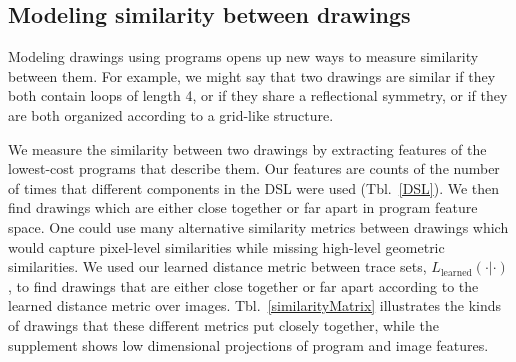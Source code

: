 \documentclass{article}
\newcommand{\probability}{\mathds{P}} %
\theoremstyle{definition}
\begin{document}



\subsection{Modeling similarity between drawings}
Modeling drawings using programs opens up new ways to measure similarity between them.
For example, we might say that two drawings are similar if they both contain loops of length 4,
or if they share a reflectional symmetry,
or if they are both organized according to a grid-like structure.

We measure the similarity between two drawings by extracting features
of the lowest-cost programs that describe them. Our features are counts of the number of times that different components in the
DSL were used (Tbl.~\ref{DSL}).
We  then find drawings which are either close together or far apart in program feature space.
One could use many
alternative similarity metrics between drawings which would capture pixel-level similarities while missing high-level geometric similarities.
We used our learned distance metric between trace sets, $L_{\text{learned}}(\cdot|\cdot)$,
to find drawings that are either close together or far apart according to the learned
distance metric over images.
Tbl.~\ref{similarityMatrix} illustrates the kinds of drawings that these different metrics put closely together,
while the supplement shows low dimensional projections of
program and image features.
\end{document}
